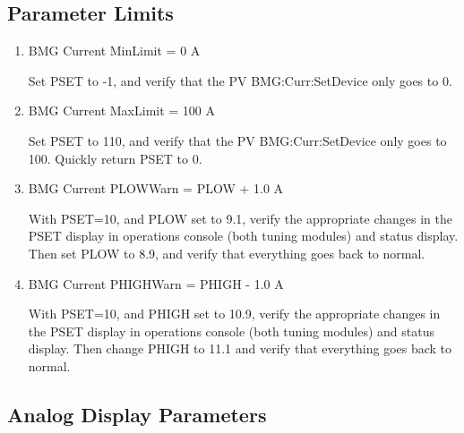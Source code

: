 \documentclass[11pt]{book}		%
\begin{document}
\subsection{Parameter Limits}

\begin{enumerate}
 \item BMG Current MinLimit = 0 A

\color{red}
Set PSET to -1, and verify that the PV BMG:Curr:SetDevice only goes to 0.
\color{black}

 \item BMG Current MaxLimit = 100 A

\color{red}
Set PSET to 110, and verify that the PV BMG:Curr:SetDevice only goes to 100. Quickly return PSET to 0.
\color{black}

 \item BMG Current PLOWWarn = PLOW + 1.0 A

\color{red}
With PSET=10, and PLOW set to 9.1, verify the appropriate changes in the PSET display in operations console (both tuning modules) and status display. Then set PLOW to 8.9, and verify that everything goes back to normal.
\color{black}

 \item BMG Current PHIGHWarn = PHIGH - 1.0 A

\color{red}
With PSET=10, and PHIGH set to 10.9, verify the appropriate changes in the PSET display in operations console (both tuning modules) and status display. Then change PHIGH to 11.1 and verify that everything goes back to normal.
\color{black}

\end{enumerate}

\subsection{Analog Display Parameters}
\end{document}
